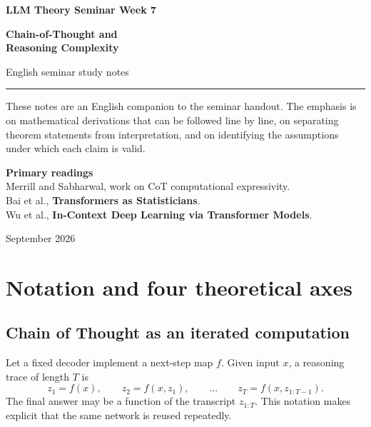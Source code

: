 \documentclass[11pt,a4paper,oneside,openany]{memoir}
\theoremstyle{definition}
\begin{document}
\begin{titlingpage}
\thispagestyle{empty}
\vspace*{1.2cm}
{\small\bfseries LLM Theory Seminar \hfill Week 7\par}
\vspace{1.4cm}
{\HUGE\bfseries Chain-of-Thought and\\[0.18em]Reasoning Complexity\par}
\vspace{0.55cm}
{\large English seminar study notes\par}
\vspace{0.9cm}
\rule{\textwidth}{0.7pt}
\vspace{1.1cm}
\begin{minipage}{0.86\textwidth}
\small
These notes are an English companion to the seminar handout.  The emphasis is on
mathematical derivations that can be followed line by line, on separating theorem
statements from interpretation, and on identifying the assumptions under which each
claim is valid.
\end{minipage}
\vfill
{\small\textbf{Primary readings}\\[0.25em]
Merrill and Sabharwal, work on CoT computational expressivity.\\Bai et al., \textbf{Transformers as Statisticians}.\\Wu et al., \textbf{In-Context Deep Learning via Transformer Models}.
\par}
\vspace{0.8cm}
{\small September 2026\par}
\end{titlingpage}
\tableofcontents*
\clearpage

\chapter{Notation and four theoretical axes}
\section{Chain of Thought as an iterated computation}
Let a fixed decoder implement a next-step map $f$.  Given input $x$, a reasoning trace of length $T$ is
\[
z_1=f(x),\qquad
z_2=f(x,z_1),\qquad\ldots\qquad
z_T=f(x,z_{1:T-1}).
\]
The final answer may be a function of the transcript $z_{1:T}$.  This notation makes explicit that the same network is reused repeatedly.
\end{document}
